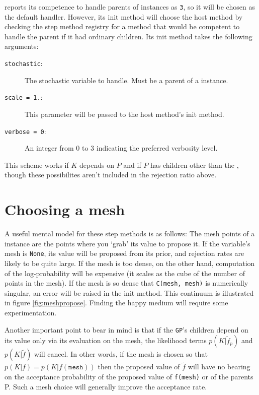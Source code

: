  reports its competence to handle parents of  instances as \texttt{3}, so it will be chosen as the default handler. However, its init method will choose the host method by checking the step method registry for a method that would be competent to handle the parent if it had ordinary children. Its init method takes the following arguments:
\begin{description}
    \item[\texttt{stochastic}:] The stochastic variable to handle. Must be a parent of a  instance.
    \item[\texttt{scale = 1.}:] This parameter will be passed to the host method's init method.
    \item[\texttt{verbose = 0}:] An integer from 0 to 3 indicating the preferred verbosity level.
\end{description}

This scheme works if $K$ depends on $P$ and if $P$ has children other than the , though these possibilites aren't included in the rejection ratio above.

\section{Choosing a mesh} A useful mental model for these step methods is as follows: The mesh points of a  instance are the points where you `grab' its value to propose it. If the variable's mesh is \texttt{None}, its value will be proposed from its prior, and rejection rates are likely to be quite large. If the mesh is too dense, on the other hand, computation of the log-probability will be expensive (it scales as the cube of the number of points in the mesh). If the mesh is so dense that \texttt{C(mesh, mesh)} is numerically singular, an error will be raised in the init method. This continuum is illustrated in figure \ref{fig:meshpropose}. Finding the happy medium will require some experimentation.

Another important point to bear in mind is that if the \texttt{GP}'s children depend on its value only via its evaluation on the mesh, the likelihood terms $p(K|\tilde f_p)$ and $p(K|\tilde f)$ will cancel. In other words, if the mesh is chosen so that $p(K|f)=p(K|f(\texttt{mesh}))$ then the proposed value of $\tilde f$ will have no bearing on the acceptance probability of the proposed value of \texttt{f(mesh)} or of the parents P. Such a mesh choice will generally improve the acceptance rate.

